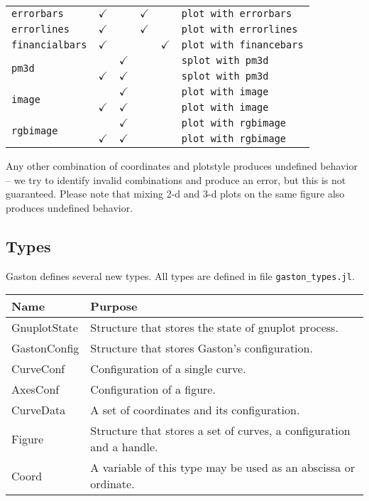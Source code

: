 \documentclass[11pt]{article}
\newcommand{\cm}{$\checkmark$}
\newcommand{\cmd}[1]{\texttt{#1}}
\begin{document}
{\begin{center}
\begin{tabular}{lccccl}
	\cmd{errorbars}     & \cm &  & \cm & & \cmd{plot with errorbars} \\
	\cmd{errorlines}    & \cm &  & \cm & & \cmd{plot with errorlines} \\
	\cmd{financialbars} & \cm &  & & \cm & \cmd{plot with financebars} \\
	\cmidrule(r){2-5}
	\multirow{2}{*}{\cmd{pm3d}}
	&     & \cm &  & & \cmd{splot with pm3d} \\
	& \cm & \cm &  & & \cmd{splot with pm3d} \\
	\cmidrule(r){2-5}
	\multirow{2}{*}{\cmd{image}}
	&     & \cm &  & & \cmd{plot with image} \\
	& \cm & \cm &  & & \cmd{plot with image} \\
	\cmidrule(r){2-5}
	\multirow{2}{*}{\cmd{rgbimage}}
	&     & \cm &  & & \cmd{plot with rgbimage} \\
	& \cm & \cm &  & & \cmd{plot with rgbimage} \\
	\bottomrule
\end{tabular}
\end{center}}

Any other combination of coordinates and plotstyle produces undefined behavior
-- we try to identify invalid combinations and produce an error, but this is
not guaranteed. Please note that mixing 2-d and 3-d plots on the same figure
also produces undefined behavior.

\subsection{Types}

Gaston defines several new types. All types are defined in file
\cmd{gaston\_types.jl}.

\begin{center}
	\begin{tabular}{lp{8cm}}
		\toprule
		\textbf{Name} & \textbf{Purpose} \\
		\midrule
		GnuplotState & Structure that stores the state of gnuplot process. \\
		GastonConfig & Structure that stores Gaston's configuration. \\
		CurveConf & Configuration of a single curve. \\
		AxesConf & Configuration of a figure. \\
		CurveData & A set of coordinates and its configuration. \\
		Figure & Structure that stores a set of curves, a configuration and a
		handle. \\
		Coord & A variable of this type may be used as an abscissa or ordinate. \\
		\bottomrule
	\end{tabular}
\end{center}
\end{document}
